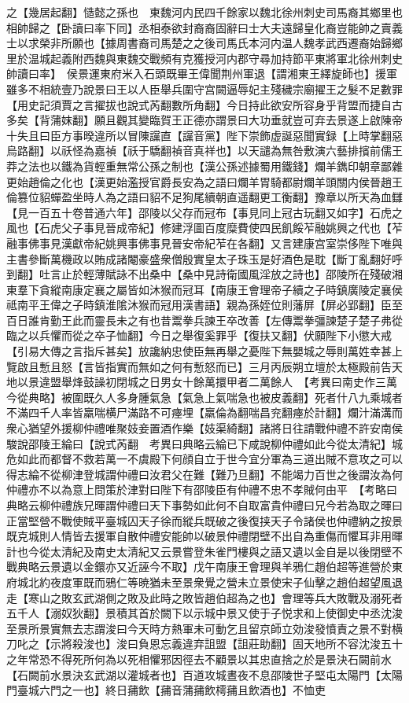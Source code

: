 之【幾居起翻】慥懿之孫也　東魏河内民四千餘家以魏北徐州刺史司馬裔其鄉里也相帥歸之【卧讀曰率下同】丞相泰欲封裔裔固辭曰士大夫遠歸皇化裔豈能帥之賣義士以求榮非所願也【據周書裔司馬楚之之後司馬氏本河内温人魏孝武西遷裔始歸鄉里於温城起義附西魏與東魏交戰頻有克獲授河内郡守尋加持節平東將軍北徐州刺史帥讀曰率】　侯景運東府米入石頭既畢王偉聞荆州軍退【謂湘東王繹旋師也】援軍雖多不相統壹乃說景曰王以人臣舉兵圍守宫闕逼辱妃主殘穢宗廟擢王之髮不足數罪【用史記須賈之言擢拔也說式芮翻數所角翻】今日持此欲安所容身乎背盟而捷自古多矣【背蒲妺翻】願且觀其變臨賀王正德亦謂景曰大功垂就豈可弃去景遂上啟陳帝十失且曰臣方事暌違所以冒陳讜直【讜音黨】陛下崇飾虚誕惡聞實録【上時掌翻惡烏路翻】以祅怪為嘉禎【祅于驕翻禎音真祥也】以天譴為無咎敷演六藝排擯前儒王莽之法也以鐵為貨輕重無常公孫之制也【漢公孫述據蜀用鐵錢】爛羊鐫印朝章鄙雜更始趙倫之化也【漢更始濫授官爵長安為之語曰爛羊胃騎都尉爛羊頭關内侯晉趙王倫篡位貂蟬盈坐時人為之語曰貂不足狗尾續朝直遥翻更工衡翻】豫章以所天為血讎【見一百五十卷普通六年】邵陵以父存而冠布【事見同上冠古玩翻又如字】石虎之風也【石虎父子事見晉成帝紀】修建浮圖百度糜費使四民飢餒苲融姚興之代也【苲融事佛事見漢獻帝紀姚興事佛事見晉安帝紀苲在各翻】又言建康宫室崇侈陛下唯與主書參斷萬機政以賄成諸閹豪盛衆僧殷實皇太子珠玉是好酒色是耽【斷丁亂翻好呼到翻】吐言止於輕薄賦詠不出桑中【桑中見詩衛國風淫放之詩也】邵陵所在殘破湘東羣下貪縱南康定襄之屬皆如沐猴而冠耳【南康王會理帝子續之子時鎮廣陵定襄侯祗南平王偉之子時鎮淮隂沐猴而冠用漢書語】親為孫姪位則藩屏【屏必郢翻】臣至百日誰肯勤王此而靈長未之有也昔鬻拳兵諫王卒改善【左傳鬻拳彊諫楚子楚子弗從臨之以兵懼而從之卒子恤翻】今日之舉復奚罪乎【復扶又翻】伏願陛下小懲大戒【引易大傳之言指斥甚矣】放讒納忠使臣無再舉之憂陛下無嬰城之辱則萬姓幸甚上覽啟且慙且怒【言皆指實而無如之何有慙怒而已】三月丙辰朔立壇於太極殿前告天地以景違盟舉烽鼓譟初閉城之日男女十餘萬擐甲者二萬餘人　【考異曰南史作三萬今從典略】被圍既久人多身腫氣急【氣急上氣喘急也被皮義翻】死者什八九乘城者不滿四千人率皆羸喘横尸滿路不可瘞埋【羸倫為翻喘昌兖翻瘞於計翻】爛汁滿溝而衆心猶望外援柳仲禮唯聚妓妾置酒作樂【妓渠綺翻】諸將日往請戰仲禮不許安南侯駿說邵陵王綸曰【說式芮翻　考異曰典略云綸已下咸說柳仲禮如此今從太清紀】城危如此而都督不救若萬一不虞殿下何顔自立于世今宜分軍為三道出賊不意攻之可以得志綸不從柳津登城謂仲禮曰汝君父在難【難乃旦翻】不能竭力百世之後謂汝為何仲禮亦不以為意上問策於津對曰陛下有邵陵臣有仲禮不忠不孝賊何由平　【考略曰典略云柳仲禮族兄暉謂仲禮曰天下事勢如此何不自取富貴仲禮曰兄今若為取之暉曰正當堅營不戰使賊平臺城囚天子徐而縱兵既破之後復挟天子令諸侯也仲禮納之按景既克城則人情皆去援軍自散仲禮安能帥以破景仲禮閉壁不出自為重傷而懼耳非用暉計也今從太清紀及南史太清紀又云景嘗登朱雀門樓與之語又遺以金自是以後閉壁不戰典略云景遺以金鐶亦又近誣今不取】戊午南康王會理與羊鴉仁趙伯超等進營於東府城北約夜度軍既而鴉仁等暁猶未至景衆覺之營未立景使宋子仙擊之趙伯超望風退走【寒山之敗玄武湖側之敗及此時之敗皆趙伯超為之也】會理等兵大敗戰及溺死者五千人【溺奴狄翻】景積其首於闕下以示城中景又使于子悦求和上使御史中丞沈浚至景所景實無去志謂浚曰今天時方熱軍未可動乞且留京師立効浚發憤責之景不對横刀叱之【示將殺浚也】浚曰負恩忘義違弃詛盟【詛莊助翻】固天地所不容沈浚五十之年常恐不得死所何為以死相懼邪因徑去不顧景以其忠直捨之於是景決石闕前水【石闕前水景決玄武湖以灌城者也】百道攻城晝夜不息邵陵世子堅屯太陽門【太陽門臺城六門之一也】終日蒱飲【蒱音蒲蒱飲樗蒱且飲酒也】不恤吏
